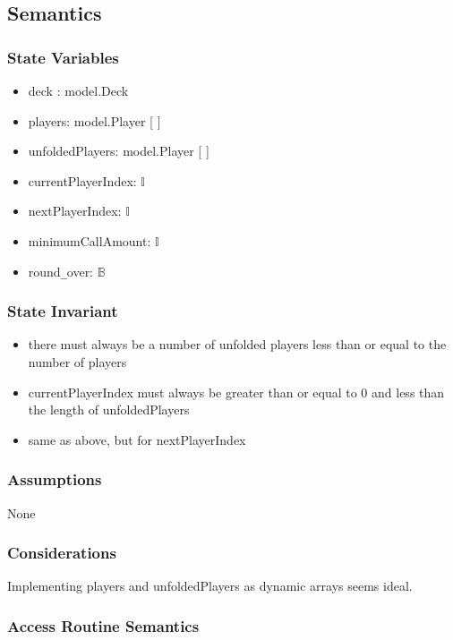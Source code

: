 \documentclass[12pt, titlepage]{article}
\begin{document}
\subsection* {Semantics}

\subsubsection* {State Variables}

\begin{itemize}
    \item deck : model.Deck
    \item players: model.Player [ ]
    \item unfoldedPlayers: model.Player [ ]
    \item currentPlayerIndex: $\mathbb{I}$
    \item nextPlayerIndex: $\mathbb{I}$
    \item minimumCallAmount: $\mathbb{I}$
    \item round\verb|_|over: $\mathbb{B}$
\end{itemize}

\subsubsection* {State Invariant}

\begin{itemize}
    \item there must always be a number of unfolded players less than or equal to the number of players
    \item currentPlayerIndex must always be greater than or equal to 0 and less than the length of unfoldedPlayers
    \item same as above, but for nextPlayerIndex
\end{itemize}

\subsubsection* {Assumptions}

None

\subsubsection* {Considerations}

Implementing players and unfoldedPlayers as dynamic arrays seems ideal.

\subsubsection* {Access Routine Semantics}
\end{document}
